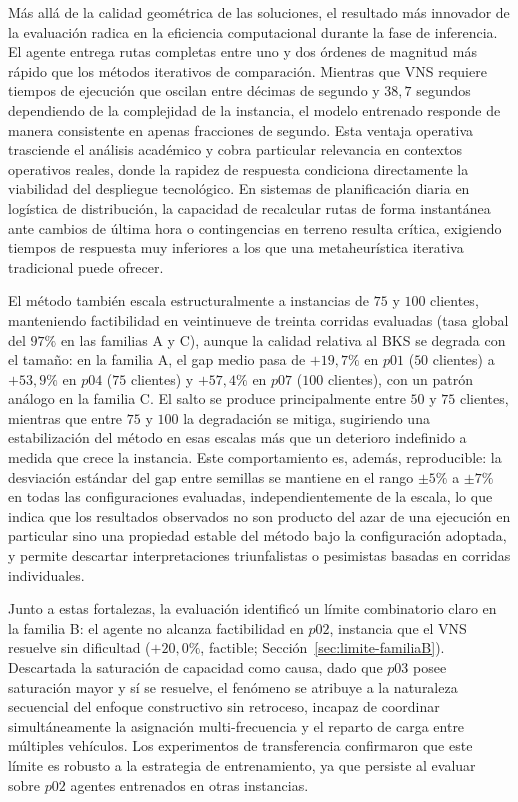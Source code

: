 Más allá de la calidad geométrica de las soluciones, el resultado más innovador de la evaluación radica en la eficiencia computacional durante la fase de inferencia. El agente entrega rutas completas entre uno y dos órdenes de magnitud más rápido que los métodos iterativos de comparación. Mientras que VNS requiere tiempos de ejecución que oscilan entre décimas de segundo y $38{,}7$ segundos dependiendo de la complejidad de la instancia, el modelo entrenado responde de manera consistente en apenas fracciones de segundo. Esta ventaja operativa trasciende el análisis académico y cobra particular relevancia en contextos operativos reales, donde la rapidez de respuesta condiciona directamente la viabilidad del despliegue tecnológico. En sistemas de planificación diaria en logística de distribución, la capacidad de recalcular rutas de forma instantánea ante cambios de última hora o contingencias en terreno resulta crítica, exigiendo tiempos de respuesta muy inferiores a los que una metaheurística iterativa tradicional puede ofrecer.

El método también escala estructuralmente a instancias de $75$ y $100$ clientes, manteniendo factibilidad en veintinueve de treinta corridas evaluadas (tasa global del $97\%$ en las familias A y C), aunque la calidad relativa al BKS se degrada con el tamaño: en la familia A, el gap medio pasa de $+19{,}7\%$ en $p01$ ($50$ clientes) a $+53{,}9\%$ en $p04$ ($75$ clientes) y $+57{,}4\%$ en $p07$ ($100$ clientes), con un patrón análogo en la familia C. El salto se produce principalmente entre $50$ y $75$ clientes, mientras que entre $75$ y $100$ la degradación se mitiga, sugiriendo una estabilización del método en esas escalas más que un deterioro indefinido a medida que crece la instancia. Este comportamiento es, además, reproducible: la desviación estándar del gap entre semillas se mantiene en el rango $\pm 5\%$ a $\pm 7\%$ en todas las configuraciones evaluadas, independientemente de la escala, lo que indica que los resultados observados no son producto del azar de una ejecución en particular sino una propiedad estable del método bajo la configuración adoptada, y permite descartar interpretaciones triunfalistas o pesimistas basadas en corridas individuales.

Junto a estas fortalezas, la evaluación identificó un límite combinatorio claro en la familia B: el agente no alcanza factibilidad en $p02$, instancia que el VNS resuelve sin dificultad ($+20{,}0\%$, factible; Sección~\ref{sec:limite-familiaB}). Descartada la saturación de capacidad como causa, dado que $p03$ posee saturación mayor y sí se resuelve, el fenómeno se atribuye a la naturaleza secuencial del enfoque constructivo sin retroceso, incapaz de coordinar simultáneamente la asignación multi-frecuencia y el reparto de carga entre múltiples vehículos. Los experimentos de transferencia confirmaron que este límite es robusto a la estrategia de entrenamiento, ya que persiste al evaluar sobre $p02$ agentes entrenados en otras instancias.

